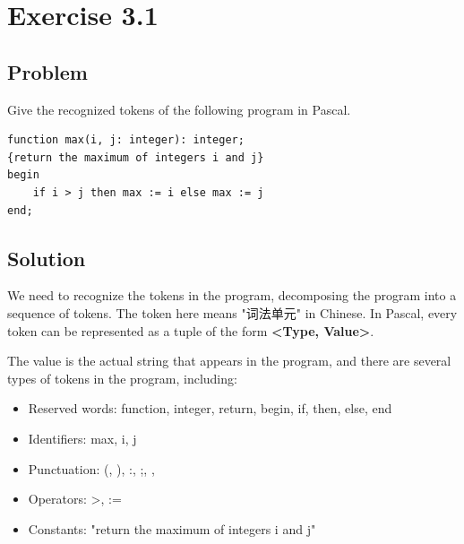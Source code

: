 


\chapter{Exercise 3.1}

\section{Problem}

Give the recognized tokens of the following program in Pascal.

\begin{lstlisting}[style=cleancpp]
function max(i, j: integer): integer;
{return the maximum of integers i and j}
begin
	if i > j then max := i else max := j
end;
\end{lstlisting}

\section{Solution}

We need to recognize the tokens in the program, decomposing the program into a sequence of tokens. The token here means "词法单元" in Chinese.
In Pascal, every token can be represented as a tuple of the form \textbf{<Type, Value>}.


The value is the actual string that appears in the program, and there are several types of tokens in the program, including:

\begin{itemize}
	\item Reserved words: function, integer, return, begin, if, then, else, end
	\item Identifiers: max, i, j
	\item Punctuation: (, ), :, ;, {, }
	\item Operators: >, :=
	\item Constants: "return the maximum of integers i and j"
\end{itemize}

